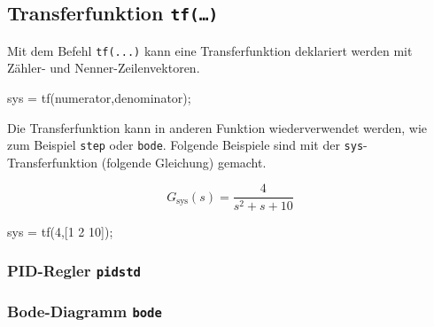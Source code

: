 \documentclass[
  10pt,
  a4paper,
  twocolumn]{article}
\newenvironment{Shaded}{}{}
\newcommand{\FloatTok}[1]{\textcolor[rgb]{0.00,0.36,0.77}{#1}}
\newcommand{\NormalTok}[1]{\textcolor[rgb]{0.14,0.16,0.18}{#1}}
\newcommand{\OperatorTok}[1]{\textcolor[rgb]{0.14,0.16,0.18}{#1}}
\newcommand{\VariableTok}[1]{\textcolor[rgb]{0.89,0.38,0.04}{#1}}
\numberwithin{equation}{section}
\begin{document}
\hypertarget{transferfunktion-tf}{%
\subsection{\texorpdfstring{Transferfunktion
\texttt{tf(…)}}{Transferfunktion tf(\ldots)}}\label{transferfunktion-tf}}

Mit dem Befehl \texttt{tf(...)} kann eine Transferfunktion deklariert
werden mit Zähler- und Nenner-Zeilenvektoren.

\begin{Shaded}
\begin{Highlighting}[]
\VariableTok{sys} \OperatorTok{=} \VariableTok{tf}\NormalTok{(}\VariableTok{numerator}\OperatorTok{,}\VariableTok{denominator}\NormalTok{)}\OperatorTok{;}
\end{Highlighting}
\end{Shaded}

Die Transferfunktion kann in anderen Funktion wiederverwendet werden,
wie zum Beispiel \texttt{step} oder \texttt{bode}. Folgende Beispiele
sind mit der \texttt{sys}-Transferfunktion (folgende Gleichung) gemacht.

\[
G_{\text{sys}}(s) = \frac{4}{s^2+s+10}
\]

\begin{Shaded}
\begin{Highlighting}[]
\VariableTok{sys} \OperatorTok{=} \VariableTok{tf}\NormalTok{(}\FloatTok{4}\OperatorTok{,}\NormalTok{[}\FloatTok{1} \FloatTok{2} \FloatTok{10}\NormalTok{])}\OperatorTok{;}
\end{Highlighting}
\end{Shaded}

\hypertarget{pid-regler-pidstd}{%
\subsubsection{\texorpdfstring{PID-Regler
\texttt{pidstd}}{PID-Regler pidstd}}\label{pid-regler-pidstd}}

\begin{Shaded}
\begin{Highlighting}[]

\end{Highlighting}
\end{Shaded}

\hypertarget{bode-diagramm-bode}{%
\subsubsection{\texorpdfstring{Bode-Diagramm
\texttt{bode}}{Bode-Diagramm bode}}\label{bode-diagramm-bode}}
\end{document}
